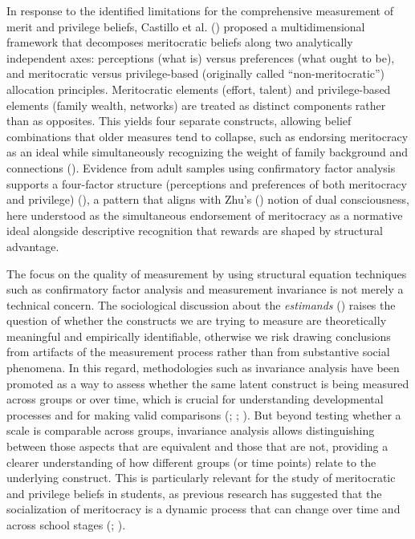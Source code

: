 \documentclass[
  13pt,
]{article}
\begin{document}
In response to the identified limitations for the comprehensive
measurement of merit and privilege beliefs, Castillo et al.
() proposed a
multidimensional framework that decomposes meritocratic beliefs along
two analytically independent axes: perceptions (what is) versus
preferences (what ought to be), and meritocratic versus privilege-based
(originally called ``non-meritocratic'') allocation principles.
Meritocratic elements (effort, talent) and privilege-based elements
(family wealth, networks) are treated as distinct components rather than
as opposites. This yields four separate constructs, allowing belief
combinations that older measures tend to collapse, such as endorsing
meritocracy as an ideal while simultaneously recognizing the weight of
family background and connections (). Evidence from adult samples using confirmatory
factor analysis supports a four-factor structure (perceptions and
preferences of both meritocracy and privilege)
(),
a pattern that aligns with Zhu's
() notion of dual
consciousness, here understood as the simultaneous endorsement of
meritocracy as a normative ideal alongside descriptive recognition that
rewards are shaped by structural advantage.

The focus on the quality of measurement by using structural equation
techniques such as confirmatory factor analysis and measurement
invariance is not merely a technical concern. The sociological
discussion about the \emph{estimands}
() raises the
question of whether the constructs we are trying to measure are
theoretically meaningful and empirically identifiable, otherwise we risk
drawing conclusions from artifacts of the measurement process rather
than from substantive social phenomena. In this regard, methodologies
such as invariance analysis have been promoted as a way to assess
whether the same latent construct is being measured across groups or
over time, which is crucial for understanding developmental processes
and for making valid comparisons
(;
;
).
But beyond testing whether a scale is comparable across groups,
invariance analysis allows distinguishing between those aspects that are
equivalent and those that are not, providing a clearer understanding of
how different groups (or time points) relate to the underlying
construct. This is particularly relevant for the study of meritocratic
and privilege beliefs in students, as previous research has suggested
that the socialization of meritocracy is a dynamic process that can
change over time and across school stages
(;
).
\end{document}
